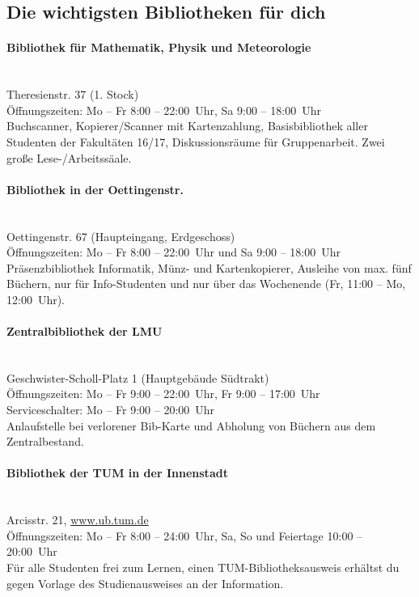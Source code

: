 \documentclass[twoside,12pt,parskip=half-]{scrartcl}
\begin{document}
\clearpage

\subsection{Die wichtigsten Bibliotheken für dich}

\paragraph{Bibliothek für Mathematik, Physik und Meteorologie}\hfill\\
Theresienstr. 37 (1. Stock)\\
Öffnungszeiten: Mo -- Fr 8:00 -- 22:00~Uhr, Sa 9:00 -- 18:00~Uhr\\
Buchscanner, Kopierer/Scanner mit Kartenzahlung, Basisbibliothek aller
Studenten der Fakultäten 16/17, Diskussionsräume für Gruppenarbeit.
Zwei große Lese-/Arbeitssäale.

\paragraph{Bibliothek in der Oettingenstr.}\hfill\\
Oettingenstr. 67 (Haupteingang, Erdgeschoss)\\
Öffnungszeiten: Mo -- Fr 8:00 -- 22:00~Uhr und Sa 9:00 -- 18:00~Uhr\\
Präsenzbibliothek Informatik, Münz- und Kartenkopierer, Ausleihe von max. fünf Büchern, nur für Info-Studenten und nur über das Wochenende (Fr, 11:00 -- Mo, 12:00~Uhr).

\paragraph{Zentralbibliothek der LMU}\hfill\\
Geschwister-Scholl-Platz 1 (Hauptgebäude Südtrakt)\\
Öffnungszeiten: Mo -- Fr 9:00 -- 22:00~Uhr, Fr 9:00 -- 17:00~Uhr\\
Serviceschalter: Mo -- Fr 9:00 -- 20:00~Uhr\\
Anlaufstelle bei verlorener Bib-Karte und Abholung von Büchern aus dem Zentralbestand.

\paragraph{Bibliothek der TUM in der Innenstadt}\hfill\\
Arcisstr. 21, \url{www.ub.tum.de}\\
Öffnungszeiten: Mo -- Fr 8:00 -- 24:00~Uhr, Sa, So und Feiertage 10:00 -- 20:00~Uhr\\
Für alle Studenten frei zum Lernen, einen TUM-Bibliotheksausweis erhältst du gegen Vorlage des Studienausweises an der Information.
\end{document}
